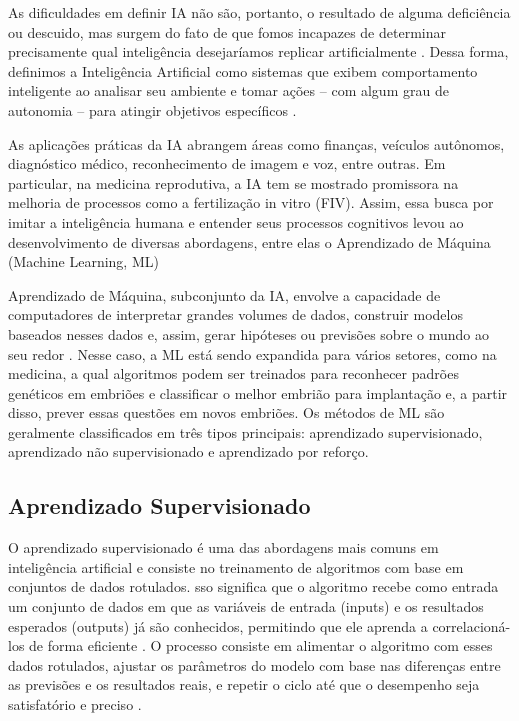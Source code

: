 As dificuldades em definir IA não são, portanto, o resultado de alguma deficiência ou descuido, mas surgem do fato de que fomos incapazes de determinar precisamente qual inteligência desejaríamos replicar artificialmente \cite{sheikh2023}. Dessa forma, definimos a Inteligência Artificial como sistemas que exibem comportamento inteligente ao analisar seu ambiente e tomar ações {–} com algum grau de autonomia {–} para atingir objetivos específicos \cite{sheikh2023}.

As aplicações práticas da IA abrangem áreas como finanças, veículos autônomos, diagnóstico médico, reconhecimento de imagem e voz, entre outras. Em particular, na medicina reprodutiva, a IA tem se mostrado promissora na melhoria de processos como a fertilização in vitro (FIV). Assim, essa busca por imitar a inteligência humana e entender seus processos cognitivos levou ao desenvolvimento de diversas abordagens, entre elas o Aprendizado de Máquina (Machine Learning, ML)

Aprendizado de Máquina, subconjunto da IA,  envolve a capacidade de computadores de interpretar grandes volumes de dados, construir modelos baseados nesses dados e, assim, gerar hipóteses ou previsões sobre o mundo ao seu redor \cite{russell2016}. Nesse caso, a ML está sendo expandida para vários setores, como na medicina, a qual algoritmos podem ser treinados para reconhecer padrões genéticos em embriões e classificar o melhor embrião para implantação e, a partir disso, prever essas questões em novos embriões. Os métodos de ML são geralmente classificados em três tipos principais: aprendizado supervisionado, aprendizado não supervisionado e aprendizado por reforço.

\subsection{Aprendizado Supervisionado}

O aprendizado supervisionado é uma das abordagens mais comuns em inteligência artificial e consiste no treinamento de algoritmos com base em conjuntos de dados rotulados. sso significa que o algoritmo recebe como entrada um conjunto de dados em que as variáveis de entrada (inputs) e os resultados esperados (outputs) já são conhecidos, permitindo que ele aprenda a correlacioná-los de forma eficiente \cite{russell2016}. O processo consiste em alimentar o algoritmo com esses dados rotulados, ajustar os parâmetros do modelo com base nas diferenças entre as previsões e os resultados reais, e repetir o ciclo até que o desempenho seja satisfatório e preciso \cite{trask2019}. 

